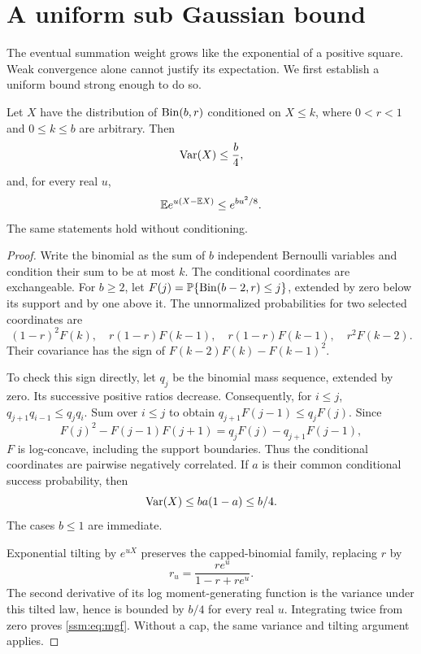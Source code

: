 \section{A uniform sub Gaussian bound}\label{ssm:sec:binomial}
The eventual summation weight grows like the exponential of a positive square. Weak convergence alone cannot justify its expectation. We first establish a uniform bound strong enough to do so.

\begin{lemma}\label{ssm:lem:subgaussian}
Let $X$ have the distribution of $\operatorname{Bin}(b,r)$ conditioned on $X\le k$, where $0<r<1$ and $0\le k\le b$ are arbitrary. Then
\begin{equation}\label{ssm:eq:variance}
 \operatorname{Var}(X)\le\frac b4,
\end{equation}
and, for every real $u$,
\begin{equation}\label{ssm:eq:mgf}
 \mathbb E e^{u(X-\mathbb E X)}\le e^{bu^2/8}.
\end{equation}
The same statements hold without conditioning.
\end{lemma}
\begin{proof}
Write the binomial as the sum of $b$ independent Bernoulli variables and condition their sum to be at most $k$. The conditional coordinates are exchangeable. For $b\ge2$, let $F(j)=\mathbb P\{\operatorname{Bin}(b-2,r)\le j\}$, extended by zero below its support and by one above it. The unnormalized probabilities for two selected coordinates are
\[
 (1-r)^2F(k),\quad r(1-r)F(k-1),\quad
 r(1-r)F(k-1),\quad r^2F(k-2).
\]
Their covariance has the sign of $F(k-2)F(k)-F(k-1)^2$.

To check this sign directly, let $q_j$ be the binomial mass sequence, extended by zero. Its successive positive ratios decrease. Consequently, for $i\le j$,
$q_{j+1}q_{i-1}\le q_jq_i$. Sum over $i\le j$ to obtain
$q_{j+1}F(j-1)\le q_jF(j)$. Since
\[
 F(j)^2-F(j-1)F(j+1)=q_jF(j)-q_{j+1}F(j-1),
\]
$F$ is log-concave, including the support boundaries. Thus the conditional coordinates are pairwise negatively correlated. If $a$ is their common conditional success probability, then
\[
 \operatorname{Var}(X)\le b a(1-a)\le b/4.
\]
The cases $b\le1$ are immediate.

Exponential tilting by $e^{uX}$ preserves the capped-binomial family, replacing $r$ by
\[
 r_u=\frac{re^u}{1-r+re^u}.
\]
The second derivative of its log moment-generating function is the variance under this tilted law, hence is bounded by $b/4$ for every real $u$. Integrating twice from zero proves \eqref{ssm:eq:mgf}. Without a cap, the same variance and tilting argument applies.
\end{proof}

